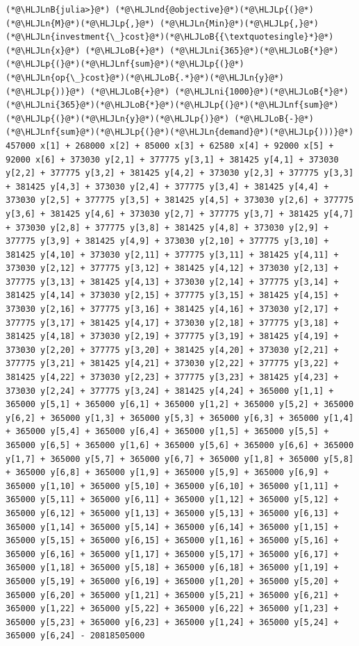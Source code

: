 \documentclass[12pt,a4paper]{article}
\newcommand{\HLJLn}[1]{#1}
\newcommand{\HLJLnd}[1]{\textcolor[RGB]{214,102,97}{#1}}
\newcommand{\HLJLnf}[1]{\textcolor[RGB]{66,102,213}{#1}}
\newcommand{\HLJLnB}[1]{\textcolor[RGB]{59,151,46}{#1}}
\newcommand{\HLJLni}[1]{\textcolor[RGB]{59,151,46}{#1}}
\newcommand{\HLJLoB}[1]{\textcolor[RGB]{102,102,102}{\textbf{#1}}}
\newcommand{\HLJLp}[1]{#1}
\begin{document}
\begin{lstlisting}
(*@\HLJLnB{julia>}@*) (*@\HLJLnd{@objective}@*)(*@\HLJLp{(}@*)(*@\HLJLn{M}@*)(*@\HLJLp{,}@*) (*@\HLJLn{Min}@*)(*@\HLJLp{,}@*) (*@\HLJLn{investment{\_}cost}@*)(*@\HLJLoB{{\textquotesingle}*}@*)(*@\HLJLn{x}@*) (*@\HLJLoB{+}@*) (*@\HLJLni{365}@*)(*@\HLJLoB{*}@*)(*@\HLJLp{(}@*)(*@\HLJLnf{sum}@*)(*@\HLJLp{(}@*)(*@\HLJLn{op{\_}cost}@*)(*@\HLJLoB{.*}@*)(*@\HLJLn{y}@*)(*@\HLJLp{))}@*) (*@\HLJLoB{+}@*) (*@\HLJLni{1000}@*)(*@\HLJLoB{*}@*)(*@\HLJLni{365}@*)(*@\HLJLoB{*}@*)(*@\HLJLp{(}@*)(*@\HLJLnf{sum}@*)(*@\HLJLp{(}@*)(*@\HLJLn{y}@*)(*@\HLJLp{)}@*) (*@\HLJLoB{-}@*) (*@\HLJLnf{sum}@*)(*@\HLJLp{(}@*)(*@\HLJLn{demand}@*)(*@\HLJLp{)))}@*)
457000 x[1] + 268000 x[2] + 85000 x[3] + 62580 x[4] + 92000 x[5] + 92000 x[6] + 373030 y[2,1] + 377775 y[3,1] + 381425 y[4,1] + 373030 y[2,2] + 377775 y[3,2] + 381425 y[4,2] + 373030 y[2,3] + 377775 y[3,3] + 381425 y[4,3] + 373030 y[2,4] + 377775 y[3,4] + 381425 y[4,4] + 373030 y[2,5] + 377775 y[3,5] + 381425 y[4,5] + 373030 y[2,6] + 377775 y[3,6] + 381425 y[4,6] + 373030 y[2,7] + 377775 y[3,7] + 381425 y[4,7] + 373030 y[2,8] + 377775 y[3,8] + 381425 y[4,8] + 373030 y[2,9] + 377775 y[3,9] + 381425 y[4,9] + 373030 y[2,10] + 377775 y[3,10] + 381425 y[4,10] + 373030 y[2,11] + 377775 y[3,11] + 381425 y[4,11] + 373030 y[2,12] + 377775 y[3,12] + 381425 y[4,12] + 373030 y[2,13] + 377775 y[3,13] + 381425 y[4,13] + 373030 y[2,14] + 377775 y[3,14] + 381425 y[4,14] + 373030 y[2,15] + 377775 y[3,15] + 381425 y[4,15] + 373030 y[2,16] + 377775 y[3,16] + 381425 y[4,16] + 373030 y[2,17] + 377775 y[3,17] + 381425 y[4,17] + 373030 y[2,18] + 377775 y[3,18] + 381425 y[4,18] + 373030 y[2,19] + 377775 y[3,19] + 381425 y[4,19] + 373030 y[2,20] + 377775 y[3,20] + 381425 y[4,20] + 373030 y[2,21] + 377775 y[3,21] + 381425 y[4,21] + 373030 y[2,22] + 377775 y[3,22] + 381425 y[4,22] + 373030 y[2,23] + 377775 y[3,23] + 381425 y[4,23] + 373030 y[2,24] + 377775 y[3,24] + 381425 y[4,24] + 365000 y[1,1] + 365000 y[5,1] + 365000 y[6,1] + 365000 y[1,2] + 365000 y[5,2] + 365000 y[6,2] + 365000 y[1,3] + 365000 y[5,3] + 365000 y[6,3] + 365000 y[1,4] + 365000 y[5,4] + 365000 y[6,4] + 365000 y[1,5] + 365000 y[5,5] + 365000 y[6,5] + 365000 y[1,6] + 365000 y[5,6] + 365000 y[6,6] + 365000 y[1,7] + 365000 y[5,7] + 365000 y[6,7] + 365000 y[1,8] + 365000 y[5,8] + 365000 y[6,8] + 365000 y[1,9] + 365000 y[5,9] + 365000 y[6,9] + 365000 y[1,10] + 365000 y[5,10] + 365000 y[6,10] + 365000 y[1,11] + 365000 y[5,11] + 365000 y[6,11] + 365000 y[1,12] + 365000 y[5,12] + 365000 y[6,12] + 365000 y[1,13] + 365000 y[5,13] + 365000 y[6,13] + 365000 y[1,14] + 365000 y[5,14] + 365000 y[6,14] + 365000 y[1,15] + 365000 y[5,15] + 365000 y[6,15] + 365000 y[1,16] + 365000 y[5,16] + 365000 y[6,16] + 365000 y[1,17] + 365000 y[5,17] + 365000 y[6,17] + 365000 y[1,18] + 365000 y[5,18] + 365000 y[6,18] + 365000 y[1,19] + 365000 y[5,19] + 365000 y[6,19] + 365000 y[1,20] + 365000 y[5,20] + 365000 y[6,20] + 365000 y[1,21] + 365000 y[5,21] + 365000 y[6,21] + 365000 y[1,22] + 365000 y[5,22] + 365000 y[6,22] + 365000 y[1,23] + 365000 y[5,23] + 365000 y[6,23] + 365000 y[1,24] + 365000 y[5,24] + 365000 y[6,24] - 20818505000


\end{lstlisting}
\end{document}

